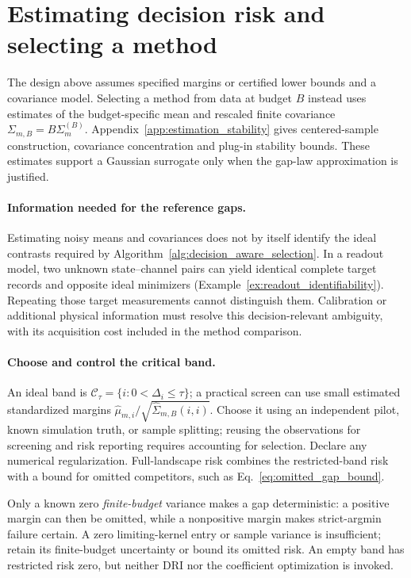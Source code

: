 \documentclass[a4paper,onecolumn,unpublished,nopdfoutputerror]{quantumarticle}
\theoremstyle{plain}
\theoremstyle{definition}
\newcommand{\calC}{\mathcal{C}}
\newcommand{\1}{\mathbf{1}}
\begin{document}
\section{Estimating decision risk and selecting a method}
\label{sec:estimating_decision_kernel}

The design above assumes specified margins or certified lower bounds and a covariance model. Selecting a method from data at budget $B$ instead uses estimates of the budget-specific mean and rescaled finite covariance $\Sigma_{m,B}=B\Sigma_m^{(B)}$. Appendix~\ref{app:estimation_stability} gives centered-sample construction, covariance concentration and plug-in stability bounds. These estimates support a Gaussian surrogate only when the gap-law approximation is justified.

\paragraph{Information needed for the reference gaps.}
Estimating noisy means and covariances does not by itself identify the ideal contrasts required by Algorithm~\ref{alg:decision_aware_selection}. In a readout model, two unknown state--channel pairs can yield identical complete target records and opposite ideal minimizers (Example~\ref{ex:readout_identifiability}). Repeating those target measurements cannot distinguish them. Calibration or additional physical information must resolve this decision-relevant ambiguity, with its acquisition cost included in the method comparison.

\paragraph{Choose and control the critical band.}
An ideal band is $\calC_\tau=\{i:0<\Delta_i\le\tau\}$; a practical screen can use small estimated standardized margins $\widehat\mu_{m,i}/\sqrt{\widehat\Sigma_{m,B}(i,i)}$. Choose it using an independent pilot, known simulation truth, or sample splitting; reusing the observations for screening and risk reporting requires accounting for selection. Declare any numerical regularization. Full-landscape risk combines the restricted-band risk with a bound for omitted competitors, such as Eq.~\eqref{eq:omitted_gap_bound}.

Only a known zero \emph{finite-budget} variance makes a gap deterministic: a positive margin can then be omitted, while a nonpositive margin makes strict-argmin failure certain. A zero limiting-kernel entry or sample variance is insufficient; retain its finite-budget uncertainty or bound its omitted risk. An empty band has restricted risk zero, but neither DRI nor the coefficient optimization is invoked.
\end{document}
